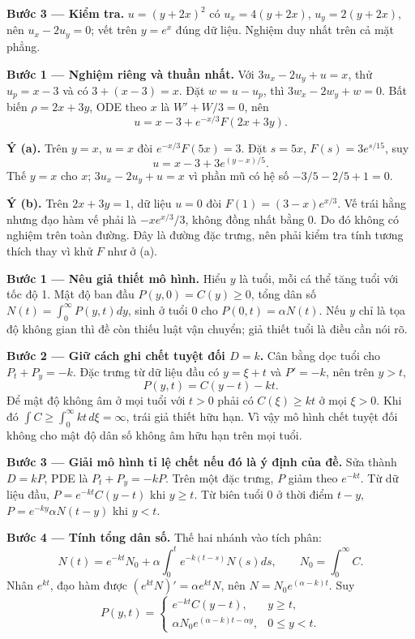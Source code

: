 \textbf{Bước 3 — Kiểm tra.} $u=(y+2x)^2$ có $u_x=4(y+2x)$, $u_y=2(y+2x)$, nên $u_x-2u_y=0$; vết trên $y=e^x$ đúng dữ liệu. Nghiệm duy nhất trên cả mặt phẳng.

\textbf{Bước 1 — Nghiệm riêng và thuần nhất.} Với $3u_x-2u_y+u=x$, thử $u_p=x-3$ và có $3+(x-3)=x$. Đặt $w=u-u_p$, thì $3w_x-2w_y+w=0$. Bất biến $\rho=2x+3y$, ODE theo $x$ là $W'+W/3=0$, nên
\[u=x-3+e^{-x/3}F(2x+3y).\]

\textbf{Ý (a).} Trên $y=x$, $u=x$ đòi $e^{-x/3}F(5x)=3$. Đặt $s=5x$, $F(s)=3e^{s/15}$, suy
\[u=x-3+3e^{(y-x)/5}.\]
Thế $y=x$ cho $x$; $3u_x-2u_y+u=x$ vì phần mũ có hệ số $-3/5-2/5+1=0$.

\textbf{Ý (b).} Trên $2x+3y=1$, dữ liệu $u=0$ đòi $F(1)=(3-x)e^{x/3}$. Vế trái hằng nhưng đạo hàm vế phải là $-xe^{x/3}/3$, không đồng nhất bằng 0. Do đó không có nghiệm trên toàn đường. Đây là đường đặc trưng, nên phải kiểm tra tính tương thích thay vì khử $F$ như ở (a).

\textbf{Bước 1 — Nêu giả thiết mô hình.} Hiểu $y$ là tuổi, mỗi cá thể tăng tuổi với tốc độ 1. Mật độ ban đầu $P(y,0)=C(y)\ge0$, tổng dân số $N(t)=\int_0^\infty P(y,t)dy$, sinh ở tuổi 0 cho $P(0,t)=\alpha N(t)$. Nếu $y$ chỉ là tọa độ không gian thì đề còn thiếu luật vận chuyển; giả thiết tuổi là điều cần nói rõ.

\textbf{Bước 2 — Giữ cách ghi chết tuyệt đối $D=k$.} Cân bằng dọc tuổi cho $P_t+P_y=-k$. Đặc trưng từ dữ liệu đầu có $y=\xi+t$ và $P'= -k$, nên trên $y>t$,
\[P(y,t)=C(y-t)-kt.\]
Để mật độ không âm ở mọi tuổi với $t>0$ phải có $C(\xi)\ge kt$ ở mọi $\xi>0$. Khi đó $\int C\ge\int_0^\infty kt\,d\xi=\infty$, trái giả thiết hữu hạn. Vì vậy mô hình chết tuyệt đối không cho mật độ dân số không âm hữu hạn trên mọi tuổi.

\textbf{Bước 3 — Giải mô hình tỉ lệ chết nếu đó là ý định của đề.} Sửa thành $D=kP$, PDE là $P_t+P_y=-kP$. Trên một đặc trưng, $P$ giảm theo $e^{-kt}$. Từ dữ liệu đầu, $P=e^{-kt}C(y-t)$ khi $y\ge t$. Từ biên tuổi 0 ở thời điểm $t-y$, $P=e^{-ky}\alpha N(t-y)$ khi $y<t$.

\textbf{Bước 4 — Tính tổng dân số.} Thế hai nhánh vào tích phân:
\[N(t)=e^{-kt}N_0+\alpha\int_0^t e^{-k(t-s)}N(s)ds,\qquad N_0=\int_0^\infty C.\]
Nhân $e^{kt}$, đạo hàm được $(e^{kt}N)'=\alpha e^{kt}N$, nên $N=N_0e^{(\alpha-k)t}$. Suy
\[P(y,t)=\begin{cases}e^{-kt}C(y-t),&y\ge t,\\ \alpha N_0e^{(\alpha-k)t-\alpha y},&0\le y<t.\end{cases}\]

